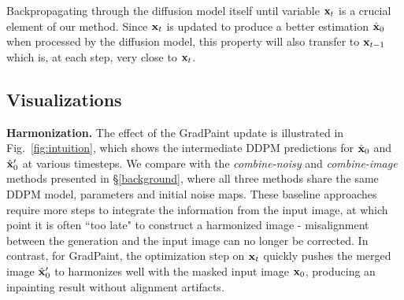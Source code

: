 Backpropagating through the diffusion model itself until variable $\mathbf{x}_t$ is a crucial element of our method. Since $\mathbf{x}_t$ is updated to produce a better estimation $\hat{\mathbf{x}}_0$ when processed by the diffusion model, this property will also transfer to $\mathbf{x}_{t-1}$ which is, at each step, very close to $\mathbf{x}_t$.












\subsection{Visualizations}

\noindent \textbf{Harmonization.} The effect of the GradPaint update is illustrated in Fig.~\ref{fig:intuition}, 
which shows the intermediate DDPM predictions for $\hat{\mathbf{x}}_0$ and $\hat{\mathbf{x}}_0'$ at various timesteps. We 
compare \acro{} with the \textit{combine-noisy} and \textit{combine-image} methods presented in \S\ref{background}, where all three methods share the same DDPM model, parameters and initial noise maps.
These baseline approaches require more steps to integrate the information from the input image, at which point it is often ``too late" to construct a harmonized image - misalignment between the generation and the input image can no longer be corrected. In contrast, for GradPaint, the optimization step on $\mathbf{x}_t$ quickly pushes the merged image $\hat{\mathbf{x}}_0'$ to harmonizes well with the masked input image $\mathbf{x}_0$, producing an inpainting result without alignment artifacts.


